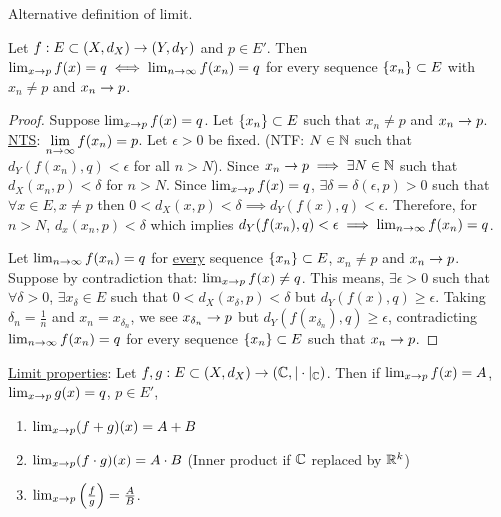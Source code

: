 \documentclass[]{article}
\begin{document}
Alternative definition of limit.

\begin{theorem}
	Let $f:E\subset(X,d_X)\rightarrow(Y,d_Y)$ and $p\in E'$.
	Then $\lim_{x\rightarrow p} f(x)=q \iff \lim_{n\rightarrow\infty} f(x_n) = q$ for every sequence $\left\{ x_n \right\}\subset E$ with $x_n\neq p$ and $x_n\rightarrow p$.
\end{theorem}
\begin{proof}
	\say{$\implies$} Suppose $\lim_{x\rightarrow p} f(x) = q$. Let $\left\{ x_n \right\}\subset E$ such that $x_n\neq p$ and $x_n\rightarrow p$.
	\ul{\ul{NTS}}: $\displaystyle \lim_{n\rightarrow\infty} f(x_n) = p$.
	Let $\epsilon>0$ be fixed. 
	(NTF: $N\in\mathbb{N}$ such that $d_Y(f(x_n),q)<\epsilon$ for all $n>N$).
	Since $x_n\rightarrow p \implies \exists N\in\mathbb{N}$ such that $d_X(x_n,p)<\delta$ for $n>N$.
	Since $\lim_{x\rightarrow p} f(x) = q$, $\exists\delta=\delta(\epsilon,p)>0$ such that $\forall x\in E,x\neq p$ then $0<d_X(x,p)<\delta\implies d_Y(f(x),q)<\epsilon$.
	Therefore, for $n>N$, $d_x(x_n,p)<\delta$ which implies $d_Y(f(x_n),q)<\epsilon \implies \lim_{n\rightarrow\infty}f(x_n)=q$.

	\say{$\Lla$} Let $\lim_{n\rightarrow\infty} f(x_n) = q$ for \ul{every} sequence $\left\{ x_n \right\}\subset E$, $x_n\neq p$ and $x_n\rightarrow p$.
	Suppose by contradiction that: $\lim_{x\rightarrow p} f(x)\neq q$.
	This means, $\exists\epsilon>0$ such that \ul{$\forall\delta>0$}, $\exists x_\delta\in E$ such that $0<d_X(x_\delta,p)<\delta$ but $d_Y(f(x),q)\geq \epsilon$.
	Taking $\delta_n = \frac1n$ and $x_n = x_{\delta_n}$, we see $x_{\delta_n}\rightarrow p$ but $d_Y(f(x_{\delta_n}),q)\geq\epsilon$, contradicting $\lim_{n\rightarrow\infty} f(x_n)=q$ for every sequence $\left\{ x_n \right\}\subset E$ such that $x_n\rightarrow p$.
\end{proof}

\ul{Limit properties}: Let $f,g:E\subset(X,d_X)\rightarrow(\mathbb{C},|\cdot|_{\mathbb{C}})$.
Then if $\lim_{x\rightarrow p} f(x) = A$, $\lim_{x\rightarrow p} g(x) = q$, $p\in E'$,
\begin{enumerate}
	\item $\lim_{x\rightarrow p} (f+g)(x) = A+B$
	\item $\lim_{x\rightarrow p} (f\cdot g)(x) = A\cdot B$ (Inner product if $\mathbb{C}$ replaced by $\mathbb{R}^k$)
	\item $\lim_{x\rightarrow p} \left(\frac fg\right) = \frac AB$.
\end{enumerate}
\end{document}
